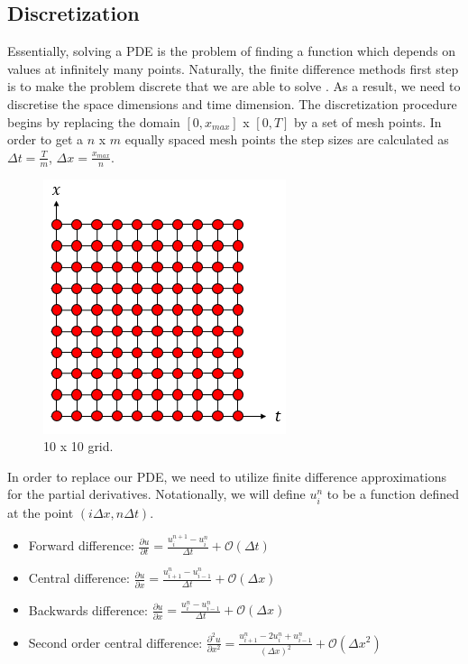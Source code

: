 \documentclass[12pt, oneside]{book}
\theoremstyle{plain}
\theoremstyle{definition}
\begin{document}
\subsection{Discretization}
Essentially, solving a PDE is the problem of finding a function which depends on values at infinitely many points. Naturally, the finite difference methods first step is to make the problem discrete that we are able to solve \cite{jwthomas}. As a result, we need to discretise the space dimensions and time dimension. The discretization procedure begins by replacing the domain $[0, x_{max}]$ x  $[0, T]$  by a set of mesh points. In order to get a $n$ x $m$ equally spaced mesh points the step sizes are calculated as $ \Delta t = \frac{T}{m}$, $\Delta x = \frac{x_{max}}{n}$.

\begin{figure}[!htb]
    \centering
        \includegraphics[scale=0.8]{Discretize.png}
    \caption{10 x 10 grid.}
\end{figure}
In order to replace our PDE, we need to utilize finite difference approximations for the partial derivatives. Notationally, we will define $u^n_i$ to be a function defined at the point $(i \Delta x, n \Delta t) $.

\begin{itemize}
        \item Forward difference: $ \frac{\partial u}{\partial t} = \frac{u^{n+1}_i - u^n_i}{\Delta t} + \mathcal{O}( \Delta t) $
        \item Central difference: $ \frac{\partial u}{\partial x} = \frac{u^n_{i+1} - u^n_{i-1}}{\Delta t}   + \mathcal{O}( \Delta x) $
        \item Backwards difference: $ \frac{\partial u}{\partial x} = \frac{u^{n}_i - u^n_{i - 1}}{\Delta t}  + \mathcal{O}( \Delta x) $
        \item Second order central difference: $ \frac{\partial^2 u}{\partial x^2} = \frac{u^n_{i+1}- 2u^n_i + u^n_{i-1}}{(\Delta x)^2}  + \mathcal{O}( \Delta x^2) $
\end{itemize}
\end{document}
